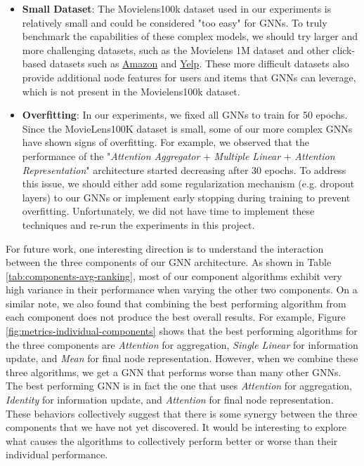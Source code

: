 \documentclass{article}
\begin{document}
\begin{itemize}
    \item \textbf{Small Dataset}: The Movielens100k dataset used in our experiments is relatively small and could be considered "too easy" for GNNs. To truly benchmark the capabilities of these complex models, we should try larger and more challenging datasets, such as the Movielens 1M dataset and other click-based datasets such as \href{http://jmcauley.ucsd.edu/data/amazon/links.html}{Amazon} and \href{https://www.yelp.com/dataset}{Yelp}. These more difficult datasets also provide additional node features for users and items that GNNs can leverage, which is not present in the Movielens100k dataset.
    \item \textbf{Overfitting}: In our experiments, we fixed all GNNs to train for 50 epochs. Since the MovieLens100K dataset is small, some of our more complex GNNs have shown signs of overfitting. For example, we observed that the performance of the "\textit{Attention Aggregator} + \textit{Multiple Linear} + \textit{Attention Representation}" architecture started decreasing after 30 epochs. To address this issue, we should either add some regularization mechanism (e.g. dropout layers) to our GNNs or implement early stopping during training to prevent overfitting. Unfortunately, we did not have time to implement these techniques and re-run the experiments in this project.
\end{itemize}

For future work, one interesting direction is to understand the interaction between the three components of our GNN architecture. As shown in Table \ref{tab:components-avg-ranking}, most of our component algorithms exhibit very high variance in their performance when varying the other two components. On a similar note, we also found that combining the best performing algorithm from each component does not produce the best overall results. For example, Figure \ref{fig:metrics-individual-components} shows that the best performing algorithms for the three components are \textit{Attention} for aggregation, \textit{Single Linear} for information update, and \textit{Mean} for final node representation. However, when we combine these three algorithms, we get a GNN that performs worse than many other GNNs. The best performing GNN is in fact the one that uses \textit{Attention} for aggregation, \textit{Identity} for information update, and \textit{Attention} for final node representation. These behaviors collectively suggest that there is some synergy between the three components that we have not yet discovered. It would be interesting to explore what causes the algorithms to collectively perform better or worse than their individual performance.
\end{document}
